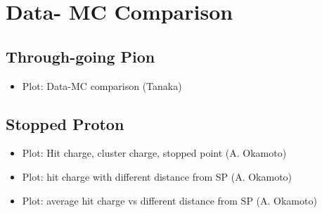 \section{Data- MC Comparison}
\subsection{Through-going Pion}
\begin{itemize}
\item Plot: Data-MC comparison  (Tanaka)
\end{itemize}

\subsection{Stopped Proton}
\begin{itemize}
\item Plot: Hit charge, cluster charge, stopped point  (A. Okamoto)
\item Plot: hit charge with different distance from SP   (A. Okamoto)
\item Plot: average hit charge vs different distance from SP   (A. Okamoto)
\end{itemize}



